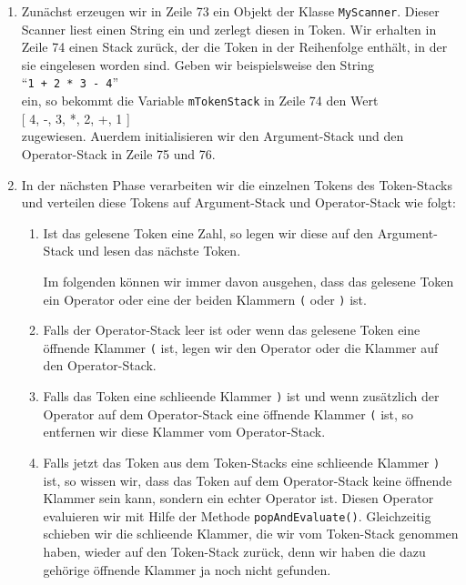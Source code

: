 \begin{enumerate}
\item Zun\"achst erzeugen wir in Zeile 73 ein Objekt der Klasse \texttt{MyScanner}.
      Dieser Scanner liest einen String ein und zerlegt diesen in Token.
      Wir erhalten in Zeile 74 einen Stack zur\"uck, der die Token in der Reihenfolge
      enth\"alt, in der sie eingelesen worden sind.  Geben wir beispielsweise den String \\[0.1cm]
      \hspace*{1.3cm} ``\texttt{1 + 2 * 3 - 4}'' \\[0.1cm]
      ein, so bekommt die Variable \texttt{mTokenStack} in Zeile 74 den Wert \\[0.1cm]
      \hspace*{1.3cm} [ 4, -, 3, *, 2, +, 1 ]
      \\[0.1cm]
      zugewiesen.
      Au\3erdem initialisieren wir den Argument-Stack und den Operator-Stack in Zeile 75 und 76.      
\item In der n\"achsten Phase verarbeiten wir die einzelnen Tokens des Token-Stacks
      und verteilen
      diese Tokens auf Argument-Stack und Operator-Stack wie folgt:
      \begin{enumerate}
      \item Ist das gelesene Token eine Zahl, so legen wir diese auf den Argument-Stack
            und lesen das n\"achste Token.
        
            Im folgenden k\"onnen wir immer davon ausgehen, dass das gelesene Token ein
            Operator oder eine der beiden Klammern \texttt{(} oder
            \texttt{)} ist. 
      \item Falls der Operator-Stack leer ist oder wenn das gelesene Token eine \"offnende Klammer
            \texttt{(} ist, legen wir den Operator oder die Klammer auf den Operator-Stack.
      \item Falls das  Token eine schlie\3ende Klammer \texttt{)} ist und wenn zus\"atzlich
            der Operator auf dem Operator-Stack eine \"offnende Klammer \texttt{(} ist, so 
            entfernen wir diese Klammer vom Operator-Stack.
      \item Falls jetzt das Token aus dem Token-Stacks eine schlie\3ende Klammer
            \texttt{)} 
            ist, so wissen wir, dass das Token auf dem Operator-Stack keine \"offnende
            Klammer sein kann, sondern ein echter Operator ist. 
            Diesen Operator evaluieren wir mit Hilfe der Methode \texttt{popAndEvaluate()}.
            Gleichzeitig schieben wir die schlie\3ende Klammer, die wir vom Token-Stack genommen
            haben, wieder auf den Token-Stack zur\"uck, denn wir haben die dazu geh\"orige
            \"offnende Klammer ja noch nicht gefunden.


\end{enumerate}
\end{enumerate}
